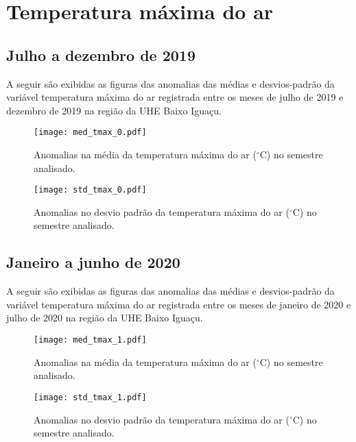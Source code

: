 \documentclass[a4paper,12pt]{article}
\begin{document}
        \newpage

        \section{Temperatura máxima do ar }
        \subsection{Julho a dezembro de 2019}
        \hspace{0.5cm} A seguir são exibidas as figuras das anomalias das médias e desvios-padrão da variável temperatura máxima do ar
        registrada entre os meses de julho de 2019 e dezembro de 2019 na região da UHE Baixo Iguaçu.

        \begin{figure}[!htb]
        \centering
        \texttt{[image: med\_tmax\_0.pdf]}
        \caption{Anomalias na média da temperatura máxima do ar ($^\circ$C) no semestre analisado.}
        \label{fig:figmed_tmax_0}
        \end{figure}

        \begin{figure}[!htb]
        \centering
        \texttt{[image: std\_tmax\_0.pdf]}
        \caption{Anomalias no desvio padrão da temperatura máxima do ar ($^\circ$C) no semestre analisado.}
        \label{fig:figstd_tmax_0}
        \end{figure}

        \newpage
        \subsection{Janeiro a junho de 2020}
        \hspace{0.5cm} A seguir são exibidas as figuras das anomalias das médias e desvios-padrão da variável temperatura máxima do ar
        registrada entre os meses de janeiro de 2020 e julho de 2020 na região da UHE Baixo Iguaçu.

        \begin{figure}[!htb]
        \centering
        \texttt{[image: med\_tmax\_1.pdf]}
        \caption{Anomalias na média da temperatura máxima do ar ($^\circ$C) no semestre analisado.}
        \label{fig:figmed_tmax_1}
        \end{figure}

        \begin{figure}[!htb]
        \centering
        \texttt{[image: std\_tmax\_1.pdf]}
        \caption{Anomalias no desvio padrão da temperatura máxima do ar ($^\circ$C) no semestre analisado.}
        \label{fig:figstd_tmax_1}
        \end{figure}
\end{document}

